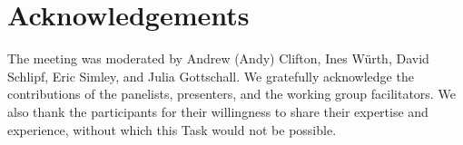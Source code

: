 \section*{Acknowledgements}
The meeting was moderated by Andrew (Andy) Clifton, Ines W\"urth, David Schlipf, Eric Simley, and Julia Gottschall. We gratefully acknowledge the contributions of the panelists, presenters, and the working group facilitators. We also thank the participants for their willingness to share their expertise and experience, without which this Task would not be possible.